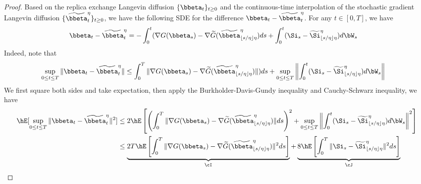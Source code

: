 \begin{proof}
Based on the replica exchange Langevin diffusion $\{\bbeta_t\}_{t\ge 0}$ and the continuous-time interpolation of the stochastic gradient Langevin diffusion $\{\widetilde \bbeta_t^{\eta}\}_{t\ge 0}$, we have the following SDE for the difference $\bbeta_t-\widetilde \bbeta^{\eta}_t$. For any $t\in [0,T]$, we have
\begin{equation*}
	\begin{split}
		\bbeta_t-\widetilde \bbeta^{\eta}_t&=-\int_0^t(\nabla G(\bbeta_s)-\nabla\widetilde G(\widetilde \bbeta^{\eta}_{\lfloor s/\eta \rfloor\eta})ds+\int_0^t (\Si_s-\widetilde \Si^{\eta}_{\lfloor s/\eta \rfloor\eta})d\bW_s
	\end{split}
\end{equation*}
Indeed, note that
\begin{equation*}
	\begin{split}
		\sup_{0\le t\le T}\|\bbeta_t-\widetilde \bbeta^{\eta}_t\|&\le \int_0^T\|\nabla G(\bbeta_s)-\nabla\widetilde G(\widetilde \bbeta^{\eta}_{\lfloor s/\eta \rfloor\eta})\|)ds+\sup_{0\le t\le T}\left\|\int_0^t (\Si_s-\widetilde \Si^{\eta}_{\lfloor s/\eta \rfloor\eta})d\bW_s\right\|
	\end{split}
\end{equation*}
We first square both sides and take expectation, then apply the Burkholder-Davis-Gundy inequality and  Cauchy-Schwarz inequality, we have 
\begin{equation}\label{sup norm estimate 1}
	\begin{split}
	\hE[	\sup_{0\le t\le T}\|\bbeta_t-\widetilde \bbeta^{\eta}_t\|^2]&\le 2\hE\left[\left(\int_0^T\|\nabla G(\bbeta_s)-\nabla\widetilde G(\widetilde \bbeta^{\eta}_{\lfloor s/\eta \rfloor\eta})\|ds\right)^2+\sup_{0\le t\le T}\left\|\int_0^t (\Si_s-\widetilde \Si^{\eta}_{\lfloor s/\eta \rfloor\eta})d\bW_s\right\|^2\right]\\
	&\le \underbrace{2T\hE\left[\int_0^T\|\nabla G(\bbeta_s)-\nabla\widetilde G(\widetilde \bbeta^{\eta}_{\lfloor s/\eta \rfloor\eta})\|^2ds \right]}_{\cI}+\underbrace{8\hE\left[\int_0^T\|\Si_s-\widetilde \Si^{\eta}_{\lfloor s/\eta \rfloor\eta}\|^2 ds\right]}_{\cJ}
	\end{split}
\end{equation}


\end{proof}
